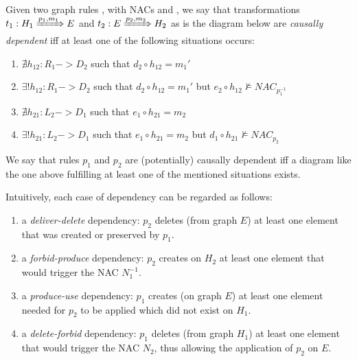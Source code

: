 \begin{definition}\label{def:classic-dependency} Given two graph rules ,  with NACs \nacone{} and \nactwo{}, we say that transformations $t_1: H_1 \xRightarrow{p_1,m_1} E$ and $t_2: E \xRightarrow{p_2,m_2} H_2$ as is the diagram below are \emph{causally dependent} iff at least one of the following situations occurs:

  \begin{enumerate}
    \item $\nexists h_{12} : R_1 -> D_2$ such that $d_2 \circ h_{12} = m_1'$
    \item $\exists! h_{12} : R_1 -> D_2$ such that $d_2 \circ h_{12} = m_1'$ but $e_2 \circ h_{12} \not\models NAC_{p_1^{-1}}$
    \item $\nexists h_{21} : L_2 -> D_1$ such that $e_1 \circ h_{21} = m_2$
    \item $\exists! h_{21} : L_2 -> D_1$ such that $e_1 \circ h_{21} = m_2$ but $d_1 \circ h_{21} \not\models NAC_{p_2}$
  \end{enumerate}


We say that rules $p_1$ and $p_2$ are (potentially) causally dependent iff a diagram like the one above fulfilling at least one of the mentioned situations exists.
\end{definition}

Intuitively, each case of dependency can be regarded as follows:

\begin{enumerate}
  \item a \emph{deliver-delete} dependency: $p_2$ deletes (from graph $E$) at least one element that was created or preserved by $p_1$.
  \item a \emph{forbid-produce} dependency: $p_2$ creates on $H_2$ at least one element that would trigger the NAC $N_1^{-1}$.
  \item a \emph{produce-use} dependency: $p_1$ creates (on graph $E$) at least one element needed for $p_2$ to be applied which did not exist on $H_1$.
  \item a \emph{delete-forbid} dependency: $p_1$ deletes (from graph $H_1$) at least one element that would trigger the NAC $N_2$, thus allowing the application of $p_2$ on $E$.
\end{enumerate}

